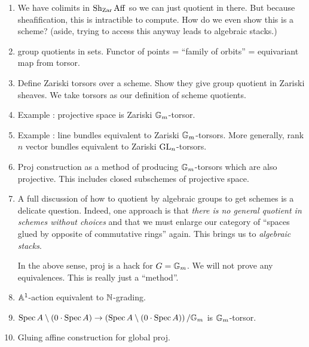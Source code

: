 \documentclass[./main.tex]{subfiles}
\begin{document}
\begin{enumerate}
  \item We have colimits in $\operatorname{Sh}_{\mathrm{Zar}} \mathrm{Aff}$ so we
  can just quotient in there.
  But because sheafification, this is intractible to compute.
  How do we even show this is a scheme?
  (aside, trying to access this anyway leads to algebraic stacks.)
  \item group quotients in sets. Functor of points
  = ``family of orbits'' = equivariant map from torsor.
  \item Define Zariski torsors over a scheme. Show they give group quotient
  in Zariski sheaves.
  We take torsors as our definition of scheme quotients.
  \item Example : projective space is Zariski $\mathbb{G}_m$-torsor.
  \item Example : line bundles equivalent to Zariski $\mathbb{G}_m$-torsors.
  More generally, rank $n$ vector bundles
  equivalent to Zariski $\operatorname{GL}_n$-torsors.
  \item Proj construction as a method of producing $\mathbb{G}_m$-torsors
  which are also projective.
  This includes closed subschemes of projective space.
  \item A full discussion of how to quotient by algebraic groups
  to get schemes is a delicate question.
  Indeed, one approach is that \emph{there is no general quotient
  in schemes without choices} and
  that we must enlarge our category of ``spaces glued by opposite of
  commutative rings'' again.
  This brings us to \emph{algebraic stacks}.

  In the above sense, proj is a hack for $G = \mathbb{G}_m$.
  We will not prove any equivalences.
  This is really just a ``method''.
  \item $\mathbb{A}^1$-action equivalent to $\mathbb{N}$-grading.
  \item $\operatorname{Spec} A \setminus (0 \cdot \operatorname{Spec} A) \to 
  \left(\operatorname{Spec} A \setminus (0 \cdot \operatorname{Spec} A)\right) / \mathbb{G}_m$
  is $\mathbb{G}_m$-torsor.
  \item Gluing affine construction for global proj.
\end{enumerate}
\end{document}

